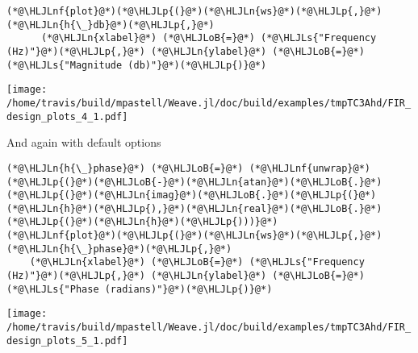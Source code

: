 \documentclass[12pt,a4paper]{article}
\newcommand{\HLJLn}[1]{#1}
\newcommand{\HLJLnf}[1]{\textcolor[RGB]{66,102,213}{#1}}
\newcommand{\HLJLs}[1]{\textcolor[RGB]{201,61,57}{#1}}
\newcommand{\HLJLoB}[1]{\textcolor[RGB]{102,102,102}{\textbf{#1}}}
\newcommand{\HLJLp}[1]{#1}
\begin{document}
\begin{lstlisting}
(*@\HLJLnf{plot}@*)(*@\HLJLp{(}@*)(*@\HLJLn{ws}@*)(*@\HLJLp{,}@*) (*@\HLJLn{h{\_}db}@*)(*@\HLJLp{,}@*)
      (*@\HLJLn{xlabel}@*) (*@\HLJLoB{=}@*) (*@\HLJLs{"Frequency (Hz)"}@*)(*@\HLJLp{,}@*) (*@\HLJLn{ylabel}@*) (*@\HLJLoB{=}@*) (*@\HLJLs{"Magnitude (db)"}@*)(*@\HLJLp{)}@*)
\end{lstlisting}

\texttt{[image: /home/travis/build/mpastell/Weave.jl/doc/build/examples/tmpTC3Ahd/FIR\_design\_plots\_4\_1.pdf]}

And again with default options


\begin{lstlisting}
(*@\HLJLn{h{\_}phase}@*) (*@\HLJLoB{=}@*) (*@\HLJLnf{unwrap}@*)(*@\HLJLp{(}@*)(*@\HLJLoB{-}@*)(*@\HLJLn{atan}@*)(*@\HLJLoB{.}@*)(*@\HLJLp{(}@*)(*@\HLJLn{imag}@*)(*@\HLJLoB{.}@*)(*@\HLJLp{(}@*)(*@\HLJLn{h}@*)(*@\HLJLp{),}@*)(*@\HLJLn{real}@*)(*@\HLJLoB{.}@*)(*@\HLJLp{(}@*)(*@\HLJLn{h}@*)(*@\HLJLp{)))}@*)
(*@\HLJLnf{plot}@*)(*@\HLJLp{(}@*)(*@\HLJLn{ws}@*)(*@\HLJLp{,}@*) (*@\HLJLn{h{\_}phase}@*)(*@\HLJLp{,}@*)
    (*@\HLJLn{xlabel}@*) (*@\HLJLoB{=}@*) (*@\HLJLs{"Frequency (Hz)"}@*)(*@\HLJLp{,}@*) (*@\HLJLn{ylabel}@*) (*@\HLJLoB{=}@*) (*@\HLJLs{"Phase (radians)"}@*)(*@\HLJLp{)}@*)
\end{lstlisting}

\texttt{[image: /home/travis/build/mpastell/Weave.jl/doc/build/examples/tmpTC3Ahd/FIR\_design\_plots\_5\_1.pdf]}
\end{document}
